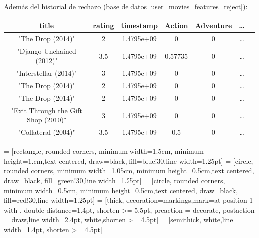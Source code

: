 Además del historial de rechazo (base de datos \ref{user_movies_features_reject}):

\begin{center}
    \begin{tabular}{|c|c|c|c|c|c|c|}
\hline
\textbf{title}          &              \textbf{rating}  &  \textbf{timestamp}   &    \textbf{Action}   &  \textbf{Adventure} & \dots \\
\hline
"The Drop (2014)"                   &      2   &   1.4795e+09  &       0        & 0  & \dots \\  
"Django Unchained (2012)"           &    3.5   &   1.4795e+09  &       0.57735  & 0  & \dots \\ 
"Interstellar (2014)"               &      3   &   1.4795e+09  &       0        & 0  & \dots \\  
"The Drop (2014)"                   &      2   &   1.4795e+09  &       0        & 0  & \dots \\  
"The Drop (2014)"                   &      2   &   1.4795e+09  &       0        & 0  & \dots \\  
"Exit Through the Gift Shop (2010)" &      3   &   1.4795e+09  &       0        & 0  & \dots \\  
"Collateral (2004)"                 &    3.5   &   1.4795e+09  &       0.5      & 0  & \dots \\  
    \hline
    \end{tabular}
\end{center}



 = [rectangle, rounded corners, minimum width=1.5cm, minimum height=1.cm,text centered, draw=black, fill=blue!30,line width=1.25pt]
%
 = [circle, rounded corners, minimum width=1.05cm, minimum height=0.5cm,text centered, draw=black, fill=green!30,line width=1.25pt]
%
 = [circle, rounded corners, minimum width=0.5cm, minimum height=0.5cm,text centered, draw=black, fill=red!30,line width=1.25pt]
 = [thick, decoration={markings,mark=at position
   1 with {}},
   double distance=1.4pt, shorten >= 5.5pt,
   preaction = {decorate},
   postaction = {draw,line width=2.4pt, white,shorten >= 4.5pt}]
 = [semithick, white,line width=1.4pt, shorten >= 4.5pt]

